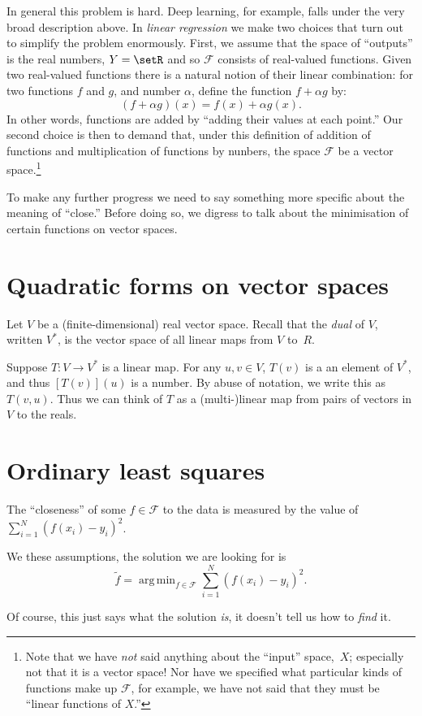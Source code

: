 \documentclass[11pt, a4paper]{article}
\DeclareMathOperator*{\argmin}{arg\,min}
\begin{document}
In general this problem is hard. Deep learning, for example, falls
under the very broad description above. In \emph{linear regression} we
make two choices that turn out to simplify the problem enormously.
First, we assume that the space of “outputs” is the real numbers, $Y =
\setR$ and so $\mathcal{F}$ consists of real-valued functions. Given two
real-valued functions there is a natural notion of their linear
combination: for two functions $f$ and $g$, and number $\alpha$, define the
function $f+\alpha g$ by:
\begin{equation*}
  (f+\alpha g)(x) = f(x) + \alpha g(x).
\end{equation*}
In other words, functions are added by “adding their values at each
point.” Our second choice is then to demand that, under this
definition of addition of functions and multiplication of functions by
nunbers, the space $\mathcal{F}$ be a vector space.\footnote{Note that we have
\emph{not} said anything about the “input” space,~$X$; especially not
that it is a vector space! Nor have we specified what particular kinds
of functions make up $\mathcal{F}$, for example, we have not said that they must
be “linear functions of $X$.”}

To make any further progress we need to say something more specific
about the meaning of “close.” Before doing so, we digress to talk
about the minimisation of certain functions on vector spaces.

\section{Quadratic forms on vector spaces}

Let $V$ be a (finite-dimensional) real vector space. Recall that the
\emph{dual} of $V$, written $V^*$, is the vector space of all linear
maps from $V$ to~$R$. 

Suppose $T\colon V\to V^*$ is a linear map. For any $u, v\in V$, $T(v)$
is a an element of $V^*$, and thus $[T(v)](u)$ is a number. By abuse
of notation, we write this as $T(v,u)$. Thus we can think of $T$ as a
(multi-)linear map from pairs of vectors in $V$ to the reals.




\section{Ordinary least squares}



The “closeness” of some $f\in\mathcal{F}$ to the data is measured by the
  value of $\sum_{i=1}^N{(f(x_i) - y_i)}^2$.


We these assumptions, the solution we are looking for is
\begin{equation*}
  \tilde{f} = \argmin_{f\in\mathcal{F}} \sum_{i=1}^N {(f(x_i) - y_i)}^2.
\end{equation*}

Of course, this just says what the solution \emph{is}, it doesn't tell
us how to \emph{find} it.
\end{document}
